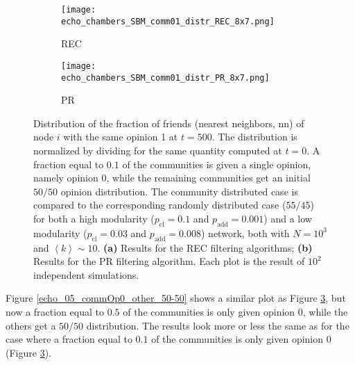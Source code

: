 \documentclass[11 pt , letterpaper , twoside , openright]{book}
\begin{document}
\begin{figure}[H]
  \begin{subfigure}[b]{0.49\textwidth}
  	\texttt{[image: echo\_chambers\_SBM\_comm01\_distr\_REC\_8x7.png]}
    \caption{REC}
    \label{rec_comm_echo}
  \end{subfigure}
  \begin{subfigure}[b]{0.49\textwidth}
  	\texttt{[image: echo\_chambers\_SBM\_comm01\_distr\_PR\_8x7.png]}
    \caption{PR}
    \label{pr_comm_echo}
  \end{subfigure}
  \captionsetup{format=plain}
  \caption[Distribution of the fraction of friends (nearest neighbors, nn) of node $i$ with the same opinion 1 at $t = 500$. A fraction equal to $0.1$ of the communities is given a single opinion, namely opinion 0, while the remaining communities get an initial $50/50$ opinion distribution. The community distributed case is compared to the corresponding randomly distributed case ($55/45$) for both a high modularity and a low modularity network. Results for the REC and PR filtering algorithm.]{Distribution of the fraction of friends (nearest neighbors, nn) of node $i$ with the same opinion 1 at $t = 500$. The distribution is normalized by dividing for the same quantity computed at $t=0$. A fraction equal to $0.1$ of the communities is given a single opinion, namely opinion 0, while the remaining communities get an initial $50/50$ opinion distribution. The community distributed case is compared to the corresponding randomly distributed case ($55/45$) for both a high modularity ($p_{\text{cl}} = 0.1$ and $p_{\text{add}} = 0.001$) and a low modularity ($p_{\text{cl}} = 0.03$ and $p_{\text{add}} = 0.008$) network, both with $N=10^3$ and $\left<k\right> \sim 10$. \textbf{(a)} Results for the REC filtering algorithms; \textbf{(b)} Results for the PR filtering algorithm. Each plot is the result of $10^2$ independent simulations.}
\label{echo_01_commOp0_other_50-50}
\end{figure}
\noindent
Figure \ref{echo_05_commOp0_other_50-50} shows a similar plot as Figure \ref{echo_01_commOp0_other_50-50}, but now a fraction equal to $0.5$ of the communities is only given opinion 0, while the others get a $50/50$ distribution. The results look more or less the same as for the case where a fraction equal to $0.1$ of the communities is only given opinion 0 (Figure \ref{echo_01_commOp0_other_50-50}).\\
\newline
\end{document}
